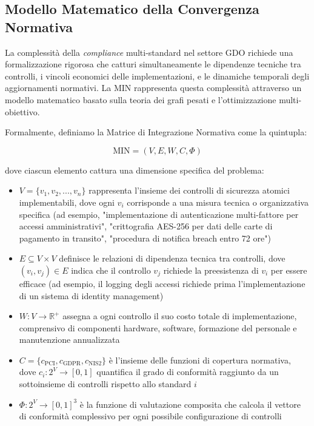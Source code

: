 \subsection{Modello Matematico della Convergenza Normativa}

La complessità della \textit{compliance} multi-standard nel settore GDO richiede una formalizzazione rigorosa che catturi simultaneamente le dipendenze tecniche tra controlli, i vincoli economici delle implementazioni, e le dinamiche temporali degli aggiornamenti normativi. La MIN rappresenta questa complessità attraverso un modello matematico basato sulla teoria dei grafi pesati e l'ottimizzazione multi-obiettivo.

Formalmente, definiamo la Matrice di Integrazione Normativa come la quintupla:

\begin{equation}
\text{MIN} = (V, E, W, C, \Phi)
\label{eq:min_definition}
\end{equation}

dove ciascun elemento cattura una dimensione specifica del problema:

\begin{itemize}
\item $V = \{v_1, v_2, ..., v_n\}$ rappresenta l'insieme dei controlli di sicurezza atomici implementabili, dove ogni $v_i$ corrisponde a una misura tecnica o organizzativa specifica (ad esempio, "implementazione di autenticazione multi-fattore per accessi amministrativi", "crittografia AES-256 per dati delle carte di pagamento in transito", "procedura di notifica breach entro 72 ore")
\item $E \subseteq V \times V$ definisce le relazioni di dipendenza tecnica tra controlli, dove $(v_i, v_j) \in E$ indica che il controllo $v_j$ richiede la preesistenza di $v_i$ per essere efficace (ad esempio, il logging degli accessi richiede prima l'implementazione di un sistema di identity management)
\item $W: V \rightarrow \mathbb{R}^+$ assegna a ogni controllo il suo costo totale di implementazione, comprensivo di componenti hardware, software, formazione del personale e manutenzione annualizzata
\item $C = \{c_{\text{PCI}}, c_{\text{GDPR}}, c_{\text{NIS2}}\}$ è l'insieme delle funzioni di copertura normativa, dove $c_i: 2^V \rightarrow [0,1]$ quantifica il grado di conformità raggiunto da un sottoinsieme di controlli rispetto allo standard $i$
\item $\Phi: 2^V \rightarrow [0,1]^3$ è la funzione di valutazione composita che calcola il vettore di conformità complessivo per ogni possibile configurazione di controlli
\end{itemize}

